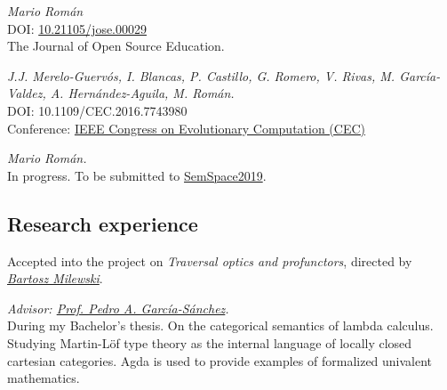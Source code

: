\documentclass[nocolors]{friggeri-cv-a4}
\begin{document}
 \begin{entrylist}
   {
     \textit{Mario Román} \\
     DOI: \href{https://jose.theoj.org/papers/10.21105/jose.00029}{10.21105/jose.00029} \\
     The Journal of Open Source Education.
   }
   
   {
     \textit{J.J. Merelo-Guervós, I. Blancas, P. Castillo, G. Romero, V. Rivas, M. García-Valdez, A. Hernández-Aguila, M. Román.} \\
     DOI: 10.1109/CEC.2016.7743980 \\
     Conference: \href{http://ieeexplore.ieee.org/document/7743980/2016}{IEEE Congress on Evolutionary Computation (CEC)}
   }

   {
     \textit{Mario Román.} \\
     In progress. To be submitted to \href{https://sites.google.com/view/semspace2019/home}{SemSpace2019}. \\
     
     }
 \end{entrylist}

\newpage
\subsection{Research experience}

\begin{entrylist}
  { Accepted into the project on
    \textit{Traversal optics and profunctors}, directed by \textit{\href{https://bartoszmilewski.com/2019/01/05/act2019-school-call-for-participation/}{Bartosz Milewski}}.
  }
  
  { {\small \textit{Advisor: \href{https://scholar.google.es/citations?user=gvq9UmMAAAAJ&hl=en&oi=ao}{Prof. Pedro A. García-Sánchez}.}} \\
    During my Bachelor's thesis. On the categorical semantics of
    lambda calculus. Studying Martin-Löf type theory as the internal
    language of locally closed cartesian categories. Agda is used to
    provide examples of formalized univalent mathematics.  }

   


\end{entrylist}
\end{document}
